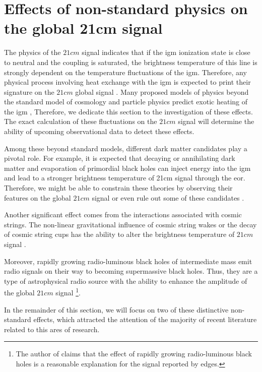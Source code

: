 \documentclass[12pt, TexShade, letterpaper]{report}
\begin{document}
\section{Effects of non-standard physics on the global 21cm signal}
\label{chap:global21cm,sub:non_standard}
The physics of the $21cm$ signal indicates that if the \gls{igm} ionization state is close to neutral and the coupling is saturated, the brightness temperature of this line is strongly dependent on the temperature fluctuations of the \gls{igm}. Therefore, any physical process involving heat exchange with the \gls{igm} is expected to print their signature on the $21cm$ global signal \cite{21century}. Many proposed models of physics beyond the standard model of cosmology and particle physics predict exotic heating of the 
\gls{igm} \cite{21century}, Therefore, we dedicate this section to the investigation of these effects. The exact calculation of these fluctuations on the $21cm$ signal will determine the ability of upcoming observational data to detect these effects.\par
Among these beyond standard models, different dark matter candidates play a pivotal role. For example, it is expected that decaying or annihilating dark matter and evaporation of primordial black holes can inject energy into the \gls{igm} and lead to a stronger brightness temperature of 21cm signal through the \gls{eor}. Therefore, we might be able to constrain these theories by observing their features on the global $21cm$ signal \cite{primordial_bh, new_physics_thesis, primordial_bh_binary, 21limit_dm_bh, bound_dm} or even rule out some of these candidates \cite{rule_out}.\par
Another significant effect comes from the interactions associated with cosmic strings. The non-linear gravitational influence of cosmic string wakes or the decay of cosmic string cups has the ability to alter the brightness temperature of $21cm$ signal \cite{WF_effect_oscar, cosmic_string_oscar, string_loop_robert}. \par
Moreover, rapidly growing radio-luminous black holes of intermediate mass emit radio signals on their way to becoming supermassive black holes. Thus, they are a type of astrophysical radio source with the ability to enhance the amplitude of the global $21cm$ signal \cite{bh_cosmioc_dawn} \footnote{The author of \cite{bh_cosmioc_dawn} claims that the effect of rapidly growing radio-luminous black holes is a reasonable explanation for the signal reported by \gls{edges}.}. \par
In the remainder of this section, we will focus on two of these distinctive non-standard effects, which attracted the attention of the majority of recent literature related to this ares of research.\par
\end{document}
